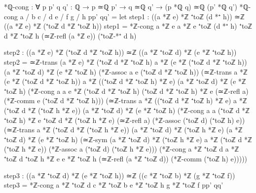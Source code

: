 \documentclass[11pt,a4paper]{book}
\begin{document}
\begin{code}
*ℚ-cong : ∀ {p p' q q' : ℚ} → p ≃ℚ p' → q ≃ℚ q' → (p *ℚ q) ≃ℚ (p' *ℚ q')
*ℚ-cong {a / b} {c / d} {e / f} {g / h} pp' qq' =
  let 
    step1 : ((a *ℤ e) *ℤ ⁺toℤ (d *⁺ h)) ≃ℤ ((a *ℤ e) *ℤ (⁺toℤ d *ℤ ⁺toℤ h))
    step1 = *ℤ-cong {a *ℤ e} {a *ℤ e} {⁺toℤ (d *⁺ h)} {⁺toℤ d *ℤ ⁺toℤ h}
                    (≃ℤ-refl (a *ℤ e)) (⁺toℤ-*⁺ d h)
    
    step2 : ((a *ℤ e) *ℤ (⁺toℤ d *ℤ ⁺toℤ h)) ≃ℤ ((a *ℤ ⁺toℤ d) *ℤ (e *ℤ ⁺toℤ h))
    step2 = ≃ℤ-trans {(a *ℤ e) *ℤ (⁺toℤ d *ℤ ⁺toℤ h)} 
                     {a *ℤ (e *ℤ (⁺toℤ d *ℤ ⁺toℤ h))} 
                     {(a *ℤ ⁺toℤ d) *ℤ (e *ℤ ⁺toℤ h)}
            (*ℤ-assoc a e (⁺toℤ d *ℤ ⁺toℤ h))
            (≃ℤ-trans {a *ℤ (e *ℤ (⁺toℤ d *ℤ ⁺toℤ h))} 
                      {a *ℤ ((⁺toℤ d *ℤ ⁺toℤ h) *ℤ e)} 
                      {(a *ℤ ⁺toℤ d) *ℤ (e *ℤ ⁺toℤ h)}
             (*ℤ-cong {a} {a} {e *ℤ (⁺toℤ d *ℤ ⁺toℤ h)} {(⁺toℤ d *ℤ ⁺toℤ h) *ℤ e} 
                      (≃ℤ-refl a) (*ℤ-comm e (⁺toℤ d *ℤ ⁺toℤ h)))
             (≃ℤ-trans {a *ℤ ((⁺toℤ d *ℤ ⁺toℤ h) *ℤ e)} 
                       {a *ℤ (⁺toℤ d *ℤ (⁺toℤ h *ℤ e))} 
                       {(a *ℤ ⁺toℤ d) *ℤ (e *ℤ ⁺toℤ h)}
              (*ℤ-cong {a} {a} {(⁺toℤ d *ℤ ⁺toℤ h) *ℤ e} {⁺toℤ d *ℤ (⁺toℤ h *ℤ e)} 
                       (≃ℤ-refl a) (*ℤ-assoc (⁺toℤ d) (⁺toℤ h) e))
              (≃ℤ-trans {a *ℤ (⁺toℤ d *ℤ (⁺toℤ h *ℤ e))} 
                        {(a *ℤ ⁺toℤ d) *ℤ (⁺toℤ h *ℤ e)} 
                        {(a *ℤ ⁺toℤ d) *ℤ (e *ℤ ⁺toℤ h)}
               (≃ℤ-sym {(a *ℤ ⁺toℤ d) *ℤ (⁺toℤ h *ℤ e)} {a *ℤ (⁺toℤ d *ℤ (⁺toℤ h *ℤ e))} 
                       (*ℤ-assoc a (⁺toℤ d) (⁺toℤ h *ℤ e)))
               (*ℤ-cong {a *ℤ ⁺toℤ d} {a *ℤ ⁺toℤ d} {⁺toℤ h *ℤ e} {e *ℤ ⁺toℤ h} 
                        (≃ℤ-refl (a *ℤ ⁺toℤ d)) (*ℤ-comm (⁺toℤ h) e)))))

    step3 : ((a *ℤ ⁺toℤ d) *ℤ (e *ℤ ⁺toℤ h)) ≃ℤ ((c *ℤ ⁺toℤ b) *ℤ (g *ℤ ⁺toℤ f))
    step3 = *ℤ-cong {a *ℤ ⁺toℤ d} {c *ℤ ⁺toℤ b} {e *ℤ ⁺toℤ h} {g *ℤ ⁺toℤ f} pp' qq'
    

\end{code}
\end{document}
